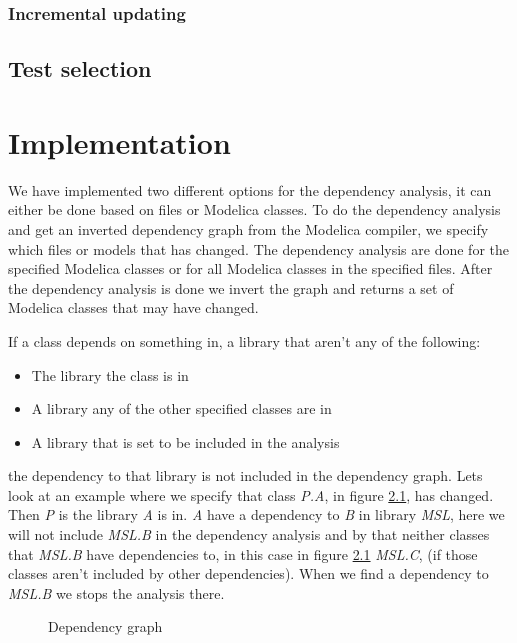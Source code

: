 \documentclass{cslthse-msc}
\begin{document}
\subsection{Incremental updating}

\section{Test selection}

\chapter[Implementation]{Implementation}
We have implemented two different options for the dependency analysis, it can either be done based on files or Modelica classes. To do the dependency analysis and get an inverted dependency graph from the Modelica compiler, we specify which files or models that has changed. The dependency analysis are done for the specified Modelica classes or for all Modelica classes in the specified files. After the dependency analysis is done we invert the graph and returns a set of Modelica classes that may have changed.

If a class depends on something in, a library that aren't any of the following: 
\begin{itemize}
	\item The library the class is in
	\item A library any of the other specified classes are in
	\item A library that is set to be included in the analysis
\end{itemize}
the dependency to that library is not included in the dependency graph. Lets look at an example where we specify that class \textit{P.A}, in figure \ref{fig:libraryGraph}, has changed. Then \textit{P} is the library \textit{A} is in. \textit{A} have a dependency to \textit{B} in library \textit{MSL}, here we will not include \textit{MSL.B} in the dependency analysis and by that neither classes that \textit{MSL.B} have dependencies to, in this case in figure \ref{fig:libraryGraph} \textit{MSL.C}, (if those classes aren't included by other dependencies). When we find a dependency to \textit{MSL.B} we stops the analysis there.

\begin{figure}[H]
    \centering
    \caption{Dependency graph}
    \label{fig:libraryGraph}
\end{figure}
\end{document}
